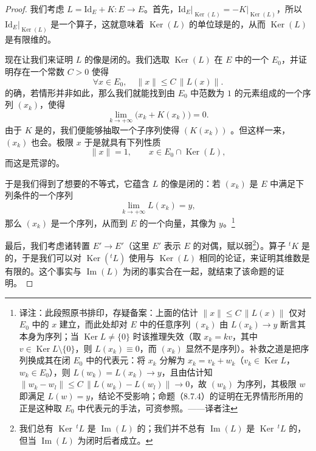 \begin{proof}
我们考虑 $L = \mathrm{Id}_E + K : E \to E$。首先，$\mathrm{Id}_E\big|_{\operatorname{Ker}(L)} = -K\big|_{\operatorname{Ker}(L)}$，所以 $\mathrm{Id}_E\big|_{\operatorname{Ker}(L)}$ 是一个\trCompact{}算子，这就意味着 $\operatorname{Ker}(L)$ 的单位球是\trCompact{}的，从而 $\operatorname{Ker}(L)$ 是有限维的。

现在让我们来证明 $L$ 的像是闭的。我们选取 $\operatorname{Ker}(L)$ 在 $E$ 中的一个\trComplement{} $E_0$，并证明存在一个常数 $C > 0$ 使得
\[
\forall x \in E_0, \quad \|x\| \le C\,\|L(x)\|.
\]
的确，若情形并非如此，那么我们就能找到由 $E_0$ 中范数为 $1$ 的元素组成的一个序列 $(x_k)$，使得
\[
\lim_{k \to +\infty} \bigl(x_k + K(x_k)\bigr) = 0.
\]
由于 $K$ 是\trCompact{}的，我们便能够抽取一个子序列使得 $(K(x_k))$ \trConvergence。但这样一来，$(x_k)$ 也会\trConvergence。极限 $x$ 于是就具有下列性质
\[
\|x\| = 1, \qquad x \in E_0 \cap \operatorname{Ker}(L),
\]
而这是荒谬的。

于是我们得到了想要的不等式，它蕴含 $L$ 的像是闭的：若 $(x_k)$ 是 $E$ 中满足下列条件的一个序列
\[
\lim_{k \to +\infty} L(x_k) = y,
\]
那么 $(x_k)$ 是一个\trCauchy{}序列，从而\trConvergence{}到 $E$ 的一个向量，其像为 $y$。\footnote{译注：此段照原书排印，存疑备案：上面的估计 $\|x\| \le C\,\|L(x)\|$ 仅对 $E_0$ 中的 $x$ 建立，而此处却对 $E$ 中的任意序列 $(x_k)$ 由 $L(x_k) \to y$ 断言其本身为\trCauchy{}序列；当 $\operatorname{Ker} L \ne \{0\}$ 时该推理失效（取 $x_k = kv$，其中 $v \in \operatorname{Ker} L \setminus \{0\}$，则 $L(x_k) \equiv 0$，而 $(x_k)$ 显然不是\trCauchy{}序列）。补救之道是把\trPreimage{}序列换成其在闭\trComplement{} $E_0$ 中的代表元：将 $x_k$ 分解为 $x_k = v_k + w_k$（$v_k \in \operatorname{Ker} L$，$w_k \in E_0$），则 $L(w_k) = L(x_k) \to y$，且由估计知 $\|w_k - w_l\| \le C\,\|L(w_k) - L(w_l)\| \to 0$，故 $(w_k)$ 为\trCauchy{}序列，其极限 $w$ 即满足 $L(w) = y$，结论不受影响；命题（8.7.4）的证明在无界情形所用的正是这种取 $E_0$ 中代表元的手法，可资参照。——译者注}

最后，我们考虑诸转置 $E' \to E'$（这里 $E'$ 表示 $E$ 的对偶，赋以弱\trTopology\footnote{我们总有 $\operatorname{Ker}\,{}^{t}L$ 是 $\operatorname{Im}(L)$ 的\trAnnihilator；我们并不总有 $\operatorname{Im}(L)$ 是 $\operatorname{Ker}\,{}^{t}L$ 的\trAnnihilator，但当 $\operatorname{Im}(L)$ 为闭时后者成立。}）。算子 ${}^{t}K$ 是\trCompact{}的，于是我们可以对 $\operatorname{Ker}({}^{t}L)$ 使用与 $\operatorname{Ker}(L)$ 相同的论证，来证明其维数是有限的。这个事实与 $\operatorname{Im}(L)$ 为闭的事实合在一起，就结束了该命题的证明。
\end{proof}

